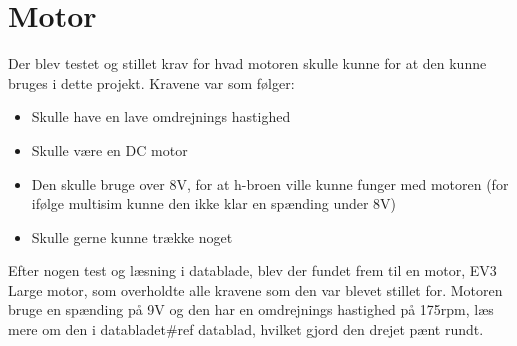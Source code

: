 \section{Motor}
Der blev testet og stillet krav for hvad motoren skulle kunne for at den kunne bruges i dette projekt. 
Kravene var som følger:
	\begin{itemize}
		\item  Skulle have en lave omdrejnings hastighed 
\item	Skulle være en DC motor
\item	Den skulle bruge over 8V, for at h-broen ville kunne funger med motoren (for ifølge multisim kunne den ikke klar en spænding under 8V)
\item	Skulle gerne kunne trække noget
\end{itemize}
Efter nogen test og læsning i datablade, blev der fundet frem til en motor, EV3 Large motor, som overholdte alle kravene som den var blevet stillet for. Motoren bruge en spænding på 9V og den har en omdrejnings hastighed på 175rpm, læs mere om den i databladet\#ref datablad, hvilket gjord den drejet pænt rundt. 

